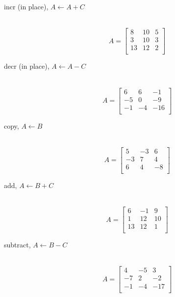 \begin{description}
  \item[incr (in place), $A\leftarrow A + C$]\ \newline
    \begin{equation}\nonumber
    A = \left[
    \begin{array}{rrr}
     8  &  10 &  5 \\
     3  &  10 &  3 \\
     13 &  12 &  2 \\
    \end{array}\right]
    \end{equation}

  \item[decr (in place), $A\leftarrow A - C$]\ \newline
    \begin{equation}\nonumber
    A = \left[
    \begin{array}{rrr}
     6  &   6  &   -1 \\
    -5  &   0  &   -9 \\
    -1  &  -4  &  -16 \\
    \end{array}\right]
    \end{equation}

  \item[copy, $A \leftarrow B$]\ \newline
    \begin{equation}\nonumber
    A = \left[
    \begin{array}{rrr}
     5  &  -3  &  6 \\
    -3  &   7  &  4 \\
     6  &   4  & -8 \\
    \end{array}\right]
    \end{equation}

  \item[add, $A \leftarrow B+C$]\ \newline
    \begin{equation}\nonumber
    A = \left[
    \begin{array}{rrr}
     6  &  -1  &  9 \\
     1  &  12  & 10 \\
    13  &  12  &  1 \\
    \end{array}\right]
    \end{equation}

  \item[subtract, $A \leftarrow B-C$]\ \newline
    \begin{equation}\nonumber
    A = \left[
    \begin{array}{rrr}
     4  &  -5  &   3 \\
    -7  &   2  &  -2 \\
    -1  &  -4  & -17 \\
    \end{array}\right]
    \end{equation}


\end{description}
